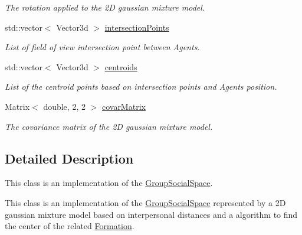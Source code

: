 \begin{DoxyCompactItemize}
\begin{DoxyCompactList}\small\item\em The rotation applied to the 2D gaussian mixture model. \end{DoxyCompactList}\item 
std\+::vector$<$ Vector3d $>$ \hyperlink{classOSpace_acc818308e36fff24106eaa8f00388038}{intersection\+Points}\hypertarget{classOSpace_acc818308e36fff24106eaa8f00388038}{}\label{classOSpace_acc818308e36fff24106eaa8f00388038}

\begin{DoxyCompactList}\small\item\em List of field of view intersection point between Agents. \end{DoxyCompactList}\item 
std\+::vector$<$ Vector3d $>$ \hyperlink{classOSpace_aaa01a3a29082df6be390aa1869946af7}{centroids}\hypertarget{classOSpace_aaa01a3a29082df6be390aa1869946af7}{}\label{classOSpace_aaa01a3a29082df6be390aa1869946af7}

\begin{DoxyCompactList}\small\item\em List of the centroid points based on intersection points and Agents position. \end{DoxyCompactList}\item 
Matrix$<$ double, 2, 2 $>$ \hyperlink{classOSpace_af7b7e14739162e0b40da89484c351dd7}{covar\+Matrix}\hypertarget{classOSpace_af7b7e14739162e0b40da89484c351dd7}{}\label{classOSpace_af7b7e14739162e0b40da89484c351dd7}

\begin{DoxyCompactList}\small\item\em The covariance matrix of the 2D gaussian mixture model. \end{DoxyCompactList}\end{DoxyCompactItemize}


\subsection{Detailed Description}
This class is an implementation of the \hyperlink{classGroupSocialSpace}{Group\+Social\+Space}. 

This class is an implementation of the \hyperlink{classGroupSocialSpace}{Group\+Social\+Space} represented by a 2D gaussian mixture model based on interpersonal distances and a algorithm to find the center of the related \hyperlink{classFormation}{Formation}. 

